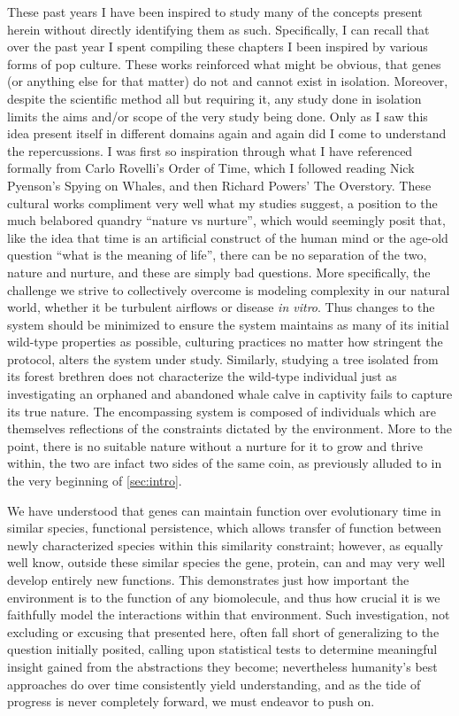 These past years I have been inspired to study many of the concepts present herein without directly identifying them as such. Specifically, I can recall that over the past year I spent compiling these chapters I been inspired by various forms of pop culture. These works reinforced what might be obvious, that genes (or anything else for that matter) do not and cannot exist in isolation. Moreover, despite the scientific method all but requiring it, any study done in isolation limits the aims and/or scope of the very study being done. Only as I saw this idea present itself in different domains again and again did I come to understand the repercussions. I was first so inspiration through what I have referenced formally from Carlo Rovelli's Order of Time\citep{rovelli}, which I followed reading Nick Pyenson's Spying on Whales\citep{pyenson},  and then Richard Powers' The Overstory\citep{powers}. These cultural works compliment very well what my studies suggest, a position to the much belabored quandry ``nature vs nurture'', which would seemingly posit that, like the idea that time is an artificial construct of the human mind or the age-old question ``what is the meaning of life'', there can be no separation of the two, nature and nurture, and these are simply bad questions. More specifically, the challenge we strive to collectively overcome is modeling complexity in our natural world, whether it be turbulent airflows or disease \emph{in vitro}. Thus changes to the system should be minimized to ensure the system maintains as many of its initial wild-type properties as possible, \eg culturing practices no matter how stringent the protocol, alters the system under study. Similarly, studying a tree isolated from its forest brethren does not characterize the wild-type individual just as investigating an orphaned and abandoned whale calve in captivity fails to capture its true nature. The encompassing system is composed of individuals which are themselves reflections of the constraints dictated by the environment. More to the point, there is no suitable nature without a nurture for it to grow and thrive within, the two are infact two sides of the same coin, as previously alluded to in the very beginning of \cref{sec:intro}.

We have understood that genes can maintain function over evolutionary time in similar species, \ie functional persistence, which allows transfer of function between newly characterized species within this similarity constraint; however, as equally well know, outside these similar species the gene, protein, \etc can and may very well develop entirely new functions. This demonstrates just how important the environment is to the function of any biomolecule, and thus how crucial it is we faithfully model the interactions within that environment. Such investigation, not excluding or excusing that presented here, often fall short of generalizing to the question initially posited, calling upon statistical tests to determine meaningful insight gained from the abstractions they become; nevertheless humanity's best approaches do over time consistently yield understanding, and as the tide of progress is never completely forward, we must endeavor to push on.

